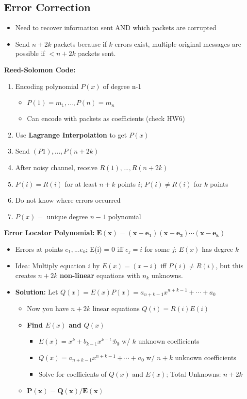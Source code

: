 \documentclass{article}\usepackage{amsmath,amssymb,amsthm,tikz,tkz-graph,color,chngpage,soul,hyperref,csquotes,graphicx,floatrow,polynom}\newcommand*{\QEDB}{\hfill\ensuremath{\square}}\newtheorem*{prop}{Proposition}\renewcommand{\theenumi}{\alph{enumi}}\usepackage[shortlabels]{enumitem}\usepackage[nobreak=true]{mdframed}\usetikzlibrary{matrix,calc}\MakeOuterQuote{"}\usepackage[margin=0.75in]{geometry} \newtheorem{theorem}{Theorem}
\begin{document}
\subsection*{Error Correction}
\begin{itemize}
\item Need to recover information sent AND which packets are corrupted
\item Send $n+2k$ packets because if $k$ errors exist, multiple original messages are possible if $< n+2k$ packets sent.
\end{itemize}
\begin{mdframed}
\textbf{Reed-Solomon Code:}
\begin{enumerate}[1.]
\item Encoding polynomial $P(x)$ of degree n-1
    \begin{itemize}
    \item $P(1) = m_1,..., P(n) = m_n$
    \item Can encode with packets as coefficients (check HW6)
    \end{itemize}
\item Use \textbf{Lagrange Interpolation} to get $P(x)$
\item Send $(P1), ..., P(n+2k)$
\item After noisy channel, receive $R(1), ..., R(n+2k)$
\item $P(i) = R(i)$ for at least $n+k$ points $i$; $P(i) \ne R(i)$ for $k$ points
\item Do not know where errors occurred
\item $P(x) =$ unique degree $n-1$ polynomial
\end{enumerate}
\textbf{Error Locator Polynomial:} $\boldsymbol{E(x)=(x-e_1)(x-e_2)\cdots(x-e_k)}$
\begin{itemize}
\item Errors at points $e_1, ... e_k$; E(i) = 0 iff $e_j = i$ for some $j$; $E(x)$ has degree $k$
\item Idea: Multiply equation $i$ by $E(x) = (x - i)$ iff $P(i) \ne R(i)$, but this creates $n+2k$ \textbf{non-linear} equations with $n_k$ unknowns.
\item \textbf{Solution:} Let $Q(x) = E(x)P(x) = a_{n+k-1}x^{n+k-1} + \cdots + a_0$
    \begin{itemize}
    \item Now you have $n+2k$ linear equations $Q(i) = R(i)E(i)$
    \item \textbf{Find $E(x)$ and $Q(x)$}
        \begin{itemize}
            \item $E(x) = x^k+b_{k-1}x^{k-1}\vdots b_0$ w/ $k$ unknown coefficients
            \item $Q(x) = a_{n+k-1}x^{n+k-1} + \cdots + a_0$ w/ $n+k$ unknown coefficients
            \item Solve for coefficients of $Q(x)$ and $E(x)$; Total Unknowns: $n+2k$
        \end{itemize}
    \item $\boldsymbol{P(x) = Q(x)/E(x)}$
    \end{itemize}
\end{itemize}
\end{mdframed}
\end{document}
